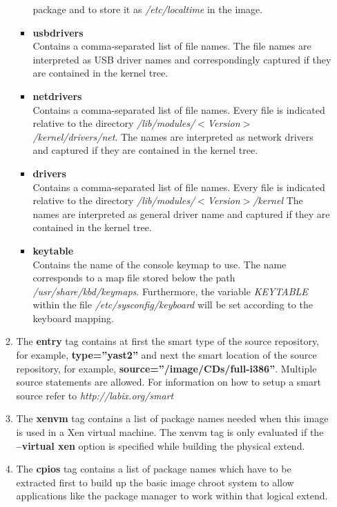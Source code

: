 \begin{itemize}
\begin{enumerate}
\begin{itemize}
                    package and to store it as \textit{/etc/localtime} in the
                    image.
              \item \textbf{usbdrivers}\\
                    Contains a comma-separated list of file names.
                    The file names are interpreted as USB driver names and
                    correspondingly captured if they are contained in the
                    kernel tree.
              \item \textbf{netdrivers}\\
                    Contains a comma-separated list of file names. Every file is
                    indicated relative to the directory
                    \textit{/lib/modules/$<$Version$>$/kernel/drivers/net}.
                    The names are interpreted as network drivers and captured if
                    they are contained in the kernel tree.
              \item \textbf{drivers}\\
                    Contains a comma-separated list of file names. Every file is
                    indicated relative to the directory
                    \textit{/lib/modules/$<$Version$>$/kernel}
                    The names are interpreted as general driver name and
                    captured if they are contained in the kernel tree.
              \item \textbf{keytable}\\
                    Contains the name of the console keymap to use. The name
                    corresponds to a map file stored below the path
                    \textit{/usr/share/kbd/keymaps}. Furthermore, the variable
                    \textit{KEYTABLE} within the file
                    \textit{/etc/sysconfig/keyboard} will be set according
                    to the keyboard mapping.
          \end{itemize}
          \item The \textbf{entry} tag contains at first the smart type of the
                source repository, for example, \textbf{type=''yast2''} and next
                the smart location of the source repository, for example,
                \textbf{source=''/image/CDs/full-i386''}. Multiple source
                statements are allowed. For information on
                how to setup a smart source refer to
                \textit{http://labix.org/smart}

		  \item The \textbf{xenvm} tag contains a list of package names
                needed when this image is used in a Xen virtual machine.
                The xenvm tag is only evaluated if the \textbf{--virtual xen}
                option is specified while building the physical extend.
          \item The \textbf{cpios} tag contains a list of package names
                which have to be extracted first to build up the basic
                image chroot system to allow applications like the package
                manager to work within that logical extend.
      \end{enumerate}


\end{itemize}
